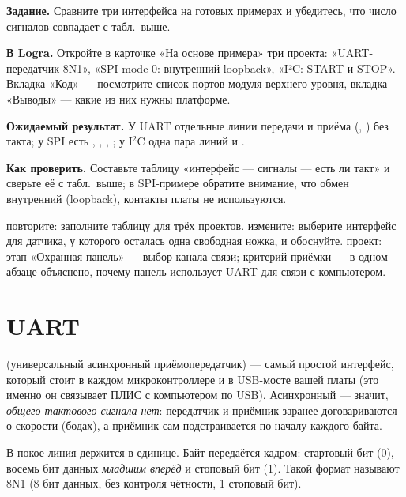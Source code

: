 \begin{diybox}
\textbf{Задание.} Сравните три интерфейса на готовых примерах и убедитесь, что число сигналов совпадает с табл.~выше.

\textbf{В Logra.} Откройте в карточке «На основе примера» три проекта: «UART-передатчик 8N1», «SPI mode 0: внутренний loopback», «I²C: START и STOP». Вкладка «Код» --- посмотрите список портов модуля верхнего уровня, вкладка «Выводы» --- какие из них нужны платформе.

\textbf{Ожидаемый результат.} У UART отдельные линии передачи и приёма (, ) без такта; у SPI есть , , , ; у I$^2$C одна пара линий  и .

\textbf{Как проверить.} Составьте таблицу «интерфейс --- сигналы --- есть ли такт» и сверьте её с табл.~выше; в SPI-примере обратите внимание, что обмен внутренний (loopback), контакты платы не используются.

 повторите: заполните таблицу для трёх проектов.  измените: выберите интерфейс для датчика, у которого осталась одна свободная ножка, и обоснуйте.  проект: этап «Охранная панель» --- выбор канала связи; критерий приёмки --- в одном абзаце объяснено, почему панель использует UART для связи с компьютером.
\end{diybox}

\section{UART}

 (универсальный асинхронный приёмопередатчик) --- самый простой
интерфейс, который стоит в каждом микроконтроллере и в USB-мосте вашей платы
(это именно он связывает ПЛИС с компьютером по USB). Асинхронный --- значит,
\emph{общего тактового сигнала нет}: передатчик и приёмник заранее
договариваются о скорости (бодах), а приёмник сам подстраивается по началу
каждого байта.

В покое линия держится в единице. Байт передаётся кадром: стартовый бит
(0), восемь бит данных \emph{младшим вперёд} и стоповый бит (1). Такой формат
называют 8N1 (8 бит данных, без контроля чётности, 1 стоповый бит).

